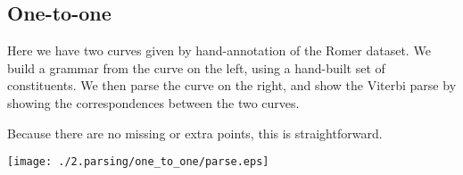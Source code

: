 

\subsection{One-to-one}

Here we have two curves given by hand-annotation of the Romer
dataset. We build a grammar from the curve on the left, using a
hand-built set of constituents. We then parse the curve on the right,
and show the Viterbi parse by showing the correspondences between the
two curves.

Because there are no missing or extra points, this is straightforward.


\texttt{[image: ./2.parsing/one\_to\_one/parse.eps]}


